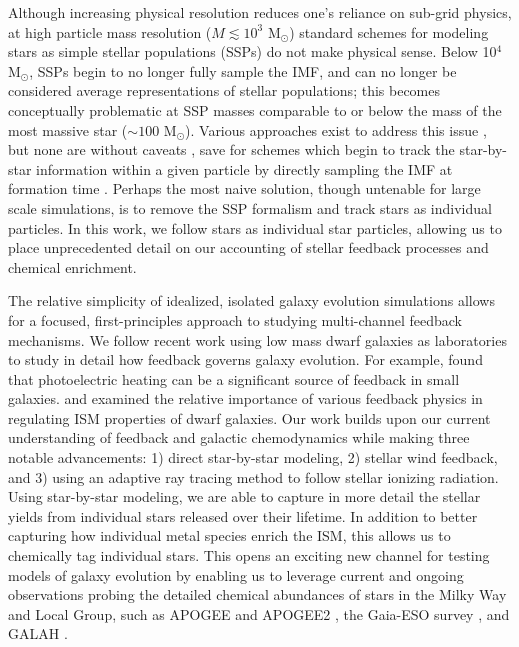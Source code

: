 \documentclass[twocolumn]{aastex61}
\begin{document}
Although increasing physical resolution reduces one's reliance on sub-grid physics, at high particle mass resolution ($M \lesssim 10^3$ M$_{\odot}$) standard schemes for modeling stars as simple stellar populations (SSPs) \citep[as studied in detail in ][]{Revaz2016} do not make physical sense. Below 10$^4$ M$_{\odot}$, SSPs begin to no longer fully sample the IMF, and can no longer be considered average representations of stellar populations; this becomes conceptually problematic at SSP masses comparable to or below the mass of the most massive star ($\sim 100$ M$_{\odot}$). Various approaches exist to address this issue \citep[e.g.][]{Kobayashi2000,WeidnerKroupa2004,Pflamm-AltenburgKroupa2006,RevazJablonka2012,Rosdahl2015,Kroupa2013}, but none are without caveats \citep{Revaz2016}, save for schemes which begin to track the star-by-star information within a given particle by directly sampling the IMF at formation time \citep[e.g.][]{Hu2017}. Perhaps the most naive solution, though untenable for large scale simulations, is to remove the SSP formalism and track stars as individual particles. In this work, we follow stars as individual star particles, allowing us to place unprecedented detail on our accounting of stellar feedback processes and chemical enrichment. 

The relative simplicity of idealized, isolated galaxy evolution simulations allows for a focused, first-principles approach to studying multi-channel feedback mechanisms. We follow recent work using low mass dwarf galaxies as laboratories to study in detail how feedback governs galaxy evolution. For example, \citet{Forbes2016} found that photoelectric heating can be a significant source of feedback in small galaxies. \citet{Hu2016} and \citet{Hu2017} examined the relative importance of various feedback physics in regulating ISM properties of dwarf galaxies. Our work builds upon our current understanding of feedback and galactic chemodynamics while making three notable advancements: 1) direct star-by-star modeling, 2) stellar wind feedback, and 3) using an adaptive ray tracing method to follow stellar ionizing radiation. Using star-by-star modeling, we are able to capture in more detail the stellar yields from individual stars released over their lifetime. In addition to better capturing how individual metal species enrich the ISM, this allows us to chemically tag individual stars. This opens an exciting new channel for testing models of galaxy evolution by enabling us to leverage current and ongoing observations probing the detailed chemical abundances of stars in the Milky Way and Local Group, such as APOGEE and APOGEE2 \citep{APOGEE2010,APOGEE}, the Gaia-ESO survey \citep{Gaia}, and GALAH \citep{GALAH}.
\end{document}
